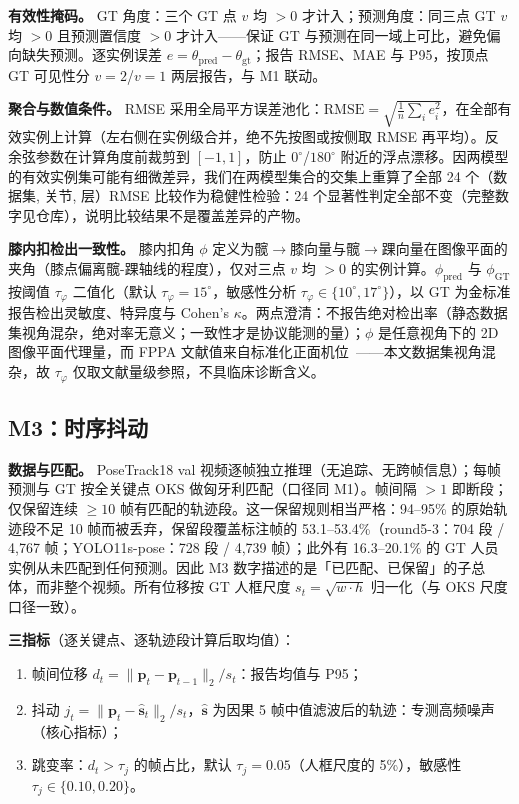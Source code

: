 \documentclass[10pt,conference]{IEEEtran}
\begin{document}
\textbf{有效性掩码。} GT 角度：三个 GT 点 $v$ 均 $>0$ 才计入；预测角度：同三点 GT $v$ 均 $>0$ 且预测置信度 $>0$ 才计入——保证 GT 与预测在同一域上可比，避免偏向缺失预测。逐实例误差 $e=\theta_{\mathrm{pred}}-\theta_{\mathrm{gt}}$；报告 RMSE、MAE 与 P95，按顶点 GT 可见性分 $v{=}2$/$v{=}1$ 两层报告，与 M1 联动。

\textbf{聚合与数值条件。} RMSE 采用全局平方误差池化：$\mathrm{RMSE}=\sqrt{\frac{1}{n}\sum_i e_i^2}$，在全部有效实例上计算（左右侧在实例级合并，绝不先按图或按侧取 RMSE 再平均）。反余弦参数在计算角度前裁剪到 $[-1,1]$，防止 $0^{\circ}$/$180^{\circ}$ 附近的浮点漂移。因两模型的有效实例集可能有细微差异，我们在两模型集合的交集上重算了全部 24 个（数据集, 关节, 层）RMSE 比较作为稳健性检验：24 个显著性判定全部不变（完整数字见仓库），说明比较结果不是覆盖差异的产物。

\textbf{膝内扣检出一致性。} 膝内扣角 $\phi$ 定义为髋$\rightarrow$膝向量与髋$\rightarrow$踝向量在图像平面的夹角（膝点偏离髋-踝轴线的程度），仅对三点 $v$ 均 $>0$ 的实例计算。$\phi_{\mathrm{pred}}$ 与 $\phi_{\mathrm{GT}}$ 按阈值 $\tau_\varphi$ 二值化（默认 $\tau_\varphi=15^{\circ}$，敏感性分析 $\tau_\varphi\in\{10^{\circ},17^{\circ}\}$），以 GT 为金标准报告检出灵敏度、特异度与 Cohen's $\kappa$。两点澄清：不报告绝对检出率（静态数据集视角混杂，绝对率无意义；一致性才是协议能测的量）；$\phi$ 是任意视角下的 2D 图像平面代理量，而 FPPA 文献值来自标准化正面机位~\cite{11}——本文数据集视角混杂，故 $\tau_\varphi$ 仅取文献量级参照，不具临床诊断含义。

\subsection{M3：时序抖动}

\textbf{数据与匹配。} PoseTrack18 val 视频逐帧独立推理（无追踪、无跨帧信息）；每帧预测与 GT 按全关键点 OKS 做匈牙利匹配（口径同 M1）。帧间隔 $>1$ 即断段；仅保留连续 $\ge10$ 帧有匹配的轨迹段。这一保留规则相当严格：94--95\% 的原始轨迹段不足 10 帧而被丢弃，保留段覆盖标注帧的 53.1--53.4\%（round5-3：704 段 / 4,767 帧；YOLO11s-pose：728 段 / 4,739 帧）；此外有 16.3--20.1\% 的 GT 人员实例从未匹配到任何预测。因此 M3 数字描述的是「已匹配、已保留」的子总体，而非整个视频。所有位移按 GT 人框尺度 $s_t=\sqrt{w\cdot h}$ 归一化（与 OKS 尺度口径一致）。

\textbf{三指标}（逐关键点、逐轨迹段计算后取均值）：

\begin{enumerate}
\item 帧间位移 $d_t=\lVert\mathbf{p}_t-\mathbf{p}_{t-1}\rVert_2/s_t$：报告均值与 P95；
\item 抖动 $j_t=\lVert\mathbf{p}_t-\hat{\mathbf{s}}_t\rVert_2/s_t$，$\hat{\mathbf{s}}$ 为因果 5 帧中值滤波后的轨迹：专测高频噪声（核心指标）；
\item 跳变率：$d_t>\tau_j$ 的帧占比，默认 $\tau_j=0.05$（人框尺度的 5\%），敏感性 $\tau_j\in\{0.10,0.20\}$。
\end{enumerate}
\end{document}

